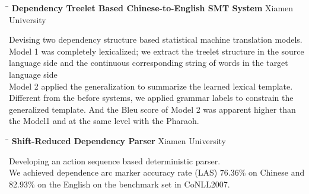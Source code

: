 \documentclass{res}
\begin{document}
\begin{resume}
\begin{tabbing}
   \hspace{2.3in}\= \hspace{2.6in}\= \kill %
    {\bf Dependency Treelet Based Chinese-to-English SMT System} \> \>Xiamen University\\
   \end{tabbing}\vspace{-20pt}      %
   Devising two dependency structure based statistical machine translation models. \\
   Model 1 was completely lexicalized; we extract the treelet structure in the source language side and the continuous corresponding string of words in the target language side\\
   Model 2 applied the generalization to summarize the learned lexical template. Different from the before systems, we applied grammar labels to constrain the generalized template. And the Bleu score of Model 2 was apparent higher than the Model1 and at the same level with the Pharaoh.
   \begin{tabbing}
   \hspace{2.3in}\= \hspace{2.6in}\= \kill %
    {\bf Shift-Reduced Dependency Parser} \> \>Xiamen University\\
   \end{tabbing}\vspace{-20pt}      %
   Developing an action sequence based deterministic parser.\\
   We achieved dependence arc marker accuracy rate (LAS) 76.36\% on Chinese and 82.93\% on the English on the benchmark set in CoNLL2007.
\end{resume}
\end{document}
